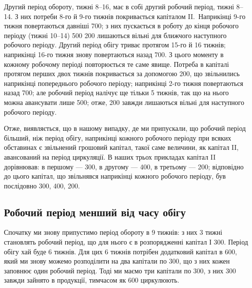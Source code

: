 
Другий період обороту, тижні 8--16, має в собі другий робочий
період, тижні 8--14. З них потреби 8-го й 9-го тижнів покривається
капіталом II.~Наприкінці 9-го тижня повертаються давніші 700;
з них пускається в роботу до кінця робочого періоду (тижні 10--14)
500 200 лишаються вільні для ближчого наступного
робочого періоду. Другий період обігу триває протягом 15-го й 16 тижнів;
наприкінці 16-го тижня знову повертаються назад 700.
З цього моменту в кожному робочому періоді повторюється те саме
явище. Потреба в капіталі протягом перших двох тижнів покривається
за допомогою 200, що звільнились наприкінці попереднього
робочого періоду; наприкінці 2-го тижня повертаються назад 700; але робочий період налічує ще тільки 5 тижнів, так що на нього
можна авансувати лише 500; отже, 200 завжди лишаються
вільні для наступного робочого періоду.

Отже, виявляється, що в нашому випадку, де ми припускали, що робочий
період більший, ніж період обігу, наприкінці кожного робочого
періоду при всяких обставинах є звільнений грошовий капітал, такої
саме величини, як капітал II, авансований на період циркуляції. В наших
трьох прикладах капітал II дорівнював: в першому — 300, в
другому — 400, в третьому — 200; відповідно до
цього капітал, що звільнявся наприкінці кожного робочого періоду, був
послідовно 300, 400, 200.

\subsection{Робочий період менший від часу обігу}

Спочатку ми знову припустимо період обороту в 9 тижнів: з них
3 тижні становлять робочий період, що для нього є в розпорядженні
капітал  І \deq{} 300. Період обігу хай буде 6 тижнів. Для цих
6 тижнів потрібен додатковий капітал в 600, який ми знову
можемо розподілити на два капітали по 300, що з них кожен
заповнює один робочий період. Тоді ми маємо три капітали по 300, з них 300 завжди зайнято в продукції, тимчасом як
600 циркулюють.


